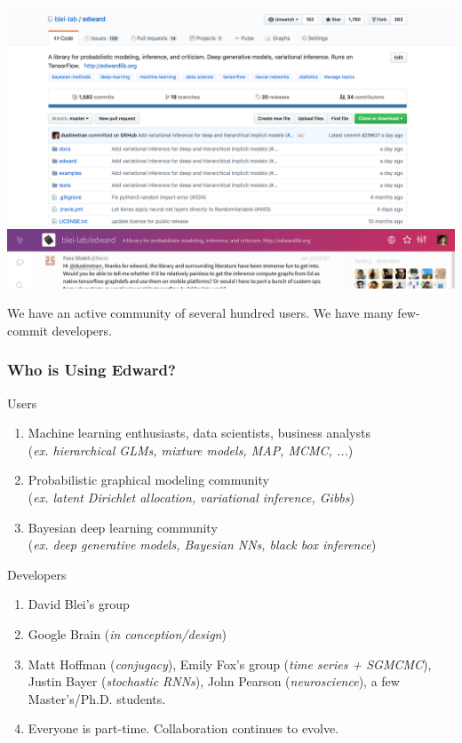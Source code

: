 \documentclass[10pt,
               xcolor={usenames,dvipsnames},
               hyperref={colorlinks,linktoc=all,citecolor=Plum,linkcolor=MidnightBlue,urlcolor=MidnightBlue},noamssymb]{beamer}
\begin{document}
\begin{frame}
\begin{center}
\vspace{-4ex}
\includegraphics[width=1.1\textwidth]{img/github.png}
\\
\includegraphics[width=1.0\textwidth]{img/gitter.png}
\\[3ex]
\end{center}
We have an active community of several hundred users. We have
many few-commit developers.
\end{frame}

\begin{frame}
\frametitle{Who is Using Edward?}
{\large Users}
\begin{enumerate}
\item
Machine learning enthusiasts, data scientists, business analysts \\
(\emph{ex. hierarchical GLMs, mixture models, MAP, MCMC, ...})
\item
Probabilistic graphical modeling community \\
(\emph{ex. latent Dirichlet allocation, variational inference, Gibbs})
\item
Bayesian deep learning community \\
(\emph{ex. deep generative models, Bayesian NNs, black box inference})
\end{enumerate}

{\large Developers}
\begin{enumerate}
\item
David Blei's group
\item
Google Brain
(\emph{in conception/design})
\item
Matt Hoffman (\emph{conjugacy}),
Emily Fox's group
(\emph{time series + SGMCMC}),
Justin Bayer (\emph{stochastic RNNs}),
John Pearson (\emph{neuroscience}),
a few Master's/Ph.D. students.
\item
Everyone is part-time. Collaboration continues to evolve.
\end{enumerate}
\end{frame}
\end{document}
